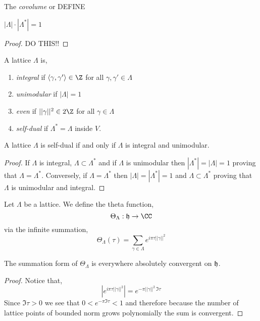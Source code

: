 \documentclass[12pt]{article}
\begin{document}
\begin{defn}
The \textit{covolume} or DEFINE
\end{defn}

\begin{prop}
$|\Lambda| \cdot |\Lambda^*| = 1$
\end{prop}

\begin{proof}
DO THIS!!
\end{proof}

\begin{defn}
A lattice $\Lambda$ is,
\begin{enumerate}
\item \textit{integral} if $\inner{\gamma}{\gamma'} \in \Z$ for all $\gamma, \gamma' \in \Lambda$
\item \textit{unimodular} if $|\Lambda| = 1$
\item \textit{even} if $|| \gamma ||^2 \in 2 \Z$ for all $\gamma \in \Lambda$
\item \textit{self-dual} if $\Lambda^* = \Lambda$ inside $V$.
\end{enumerate}
\end{defn}

\begin{lemma}
A lattice $\Lambda$ is self-dual if and only if $\Lambda$ is integral and unimodular. 
\end{lemma}

\begin{proof}
If $\Lambda$ is integral, $\Lambda \subset \Lambda^*$ and if $\Lambda$ is unimodular then $|\Lambda^*| = |\Lambda| = 1$ proving that $\Lambda = \Lambda^*$. Conversely, if $\Lambda = \Lambda^*$ then $|\Lambda| = |\Lambda^*| = 1$ and $\Lambda \subset \Lambda^*$ proving that $\Lambda$ is unimodular and integral.
\end{proof}

\begin{defn}
Let $\Lambda$ be a lattice. We define the theta function,
\[ \Theta_{\Lambda} : \h \to \CC \]
via the infinite summation,
\[ \Theta_{\Lambda}(\tau) = \sum_{\gamma \in \Lambda} e^{i \pi \tau || \gamma ||^2} \]
\end{defn}


\begin{prop}
The summation form of $\Theta_{\Lambda}$ is everywhere absolutely convergent on $\mathfrak{h}$. 
\end{prop}

\begin{proof}
Notice that,
\[ | e^{i \pi \tau || \gamma ||^2} | = e^{- \pi || \gamma ||^2 \, \Im{\tau}} \]
Since $\Im{\tau} > 0$ we see that $0 < e^{-\pi \Im{\tau}} < 1$ and therefore because the number of lattice points of bounded norm grows polynomially the sum is convergent. 
\end{proof}
\end{document}

